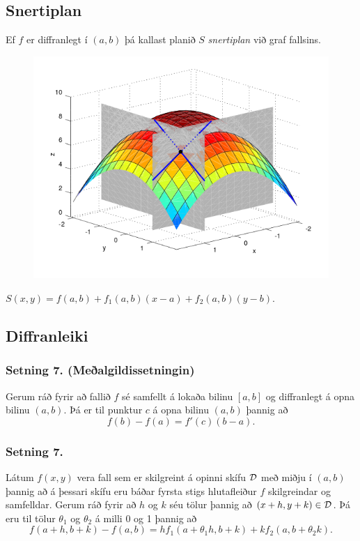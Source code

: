 \subsection{Snertiplan}
  Ef $f$ er diffranlegt í $(a,b)$ þá kallast planið $S$ \emph{snertiplan} við graf fallsins.
  \begin{figure}
           \centering
            \includegraphics[width=0.6\linewidth]{bothpart.png}
    \end{figure}
    $S(x,y) = f(a,b) + f_1(a,b)(x-a)+f_2(a,b)(y-b)$.



\subsection{Diffranleiki} 

\subsubsection{Setning 7. (Meðalgildissetningin)}
Gerum ráð fyrir að fallið $f$
sé samfellt á lokaða bilinu $[a,b]$ og diffranlegt á opna bilinu
$(a,b)$.  Þá er til punktur $c$ á opna bilinu $(a,b)$ þannig að 
$$f(b)-f(a)=f'(c)(b-a).$$




\subsubsection{Setning 7.}

Látum  $f(x,y)$ vera fall
sem er skilgreint á opinni 
skífu $\cal D$ með miðju í $(a,b)$ þannig að á þessari skífu eru báðar
fyrsta stigs hlutafleiður $f$ skilgreindar og samfelldar.  Gerum ráð fyrir að $h$
og $k$ séu tölur þannig að $(x+h, y+k)\in{\cal D}$.  Þá eru til tölur
$\theta_1$ og $\theta_2$ á milli 0 og 1 þannig að 
$$f(a+h,b+k)-f(a,b)=hf_1(a+\theta_1h,b+k)+kf_2(a,b+\theta_2k).$$


